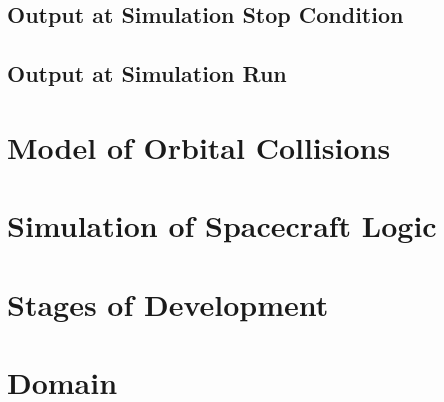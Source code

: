 \documentclass{article}
\begin{document}
  \subsection{Output at Simulation Stop Condition}
  
  \subsection{Output at Simulation Run}
  
  \section{Model of Orbital Collisions}
  
  \section{Simulation of Spacecraft Logic}
  
  \section{Stages of Development}
  
  \section{Domain}
  
  
\end{document}
